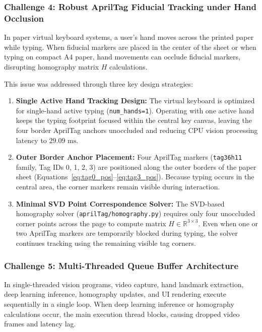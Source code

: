 \subsubsection{Challenge 4: Robust AprilTag Fiducial Tracking under Hand Occlusion}
In paper virtual keyboard systems, a user's hand moves across the printed paper while typing. When fiducial markers are placed in the center of the sheet or when typing on compact A4 paper, hand movements can occlude fiducial markers, disrupting homography matrix $H$ calculations.

This issue was addressed through three key design strategies:
\begin{enumerate}
    \item \textbf{Single Active Hand Tracking Design:} The virtual keyboard is optimized for single-hand active typing (\texttt{num\_hands=1}). Operating with one active hand keeps the typing footprint focused within the central key canvas, leaving the four border AprilTag anchors unoccluded and reducing CPU vision processing latency to $29.09\text{ ms}$.
    \item \textbf{Outer Border Anchor Placement:} Four AprilTag markers (\texttt{tag36h11} family, Tag IDs 0, 1, 2, 3) are positioned along the outer borders of the paper sheet (Equations~\ref{eq:tag0_pos}--\ref{eq:tag3_pos}). Because typing occurs in the central area, the corner markers remain visible during interaction.
    \item \textbf{Minimal SVD Point Correspondence Solver:} The SVD-based homography solver (\texttt{aprilTag/homography.py}) requires only four unoccluded corner points across the page to compute matrix $H \in \mathbb{R}^{3 \times 3}$. Even when one or two AprilTag markers are temporarily blocked during typing, the solver continues tracking using the remaining visible tag corners.
\end{enumerate}

\subsubsection{Challenge 5: Multi-Threaded Queue Buffer Architecture}
In single-threaded vision programs, video capture, hand landmark extraction, deep learning inference, homography updates, and UI rendering execute sequentially in a single loop. When deep learning inference or homography calculations occur, the main execution thread blocks, causing dropped video frames and latency lag.

